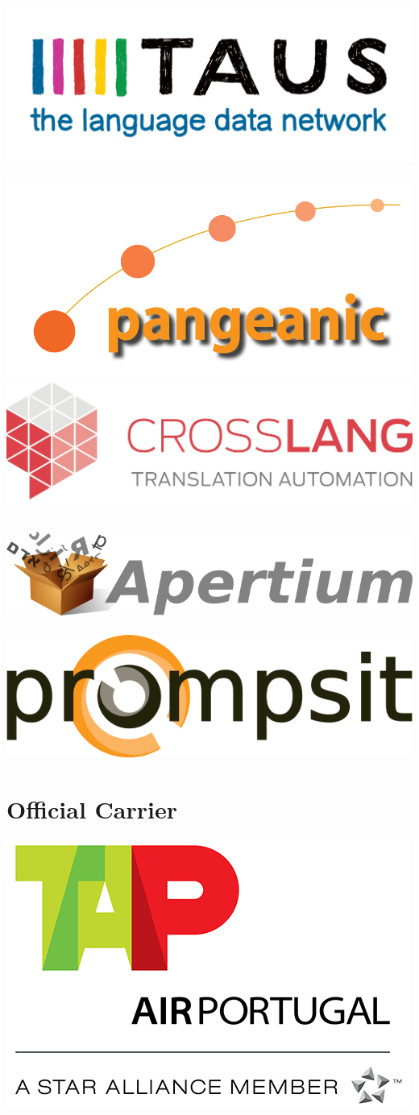 \documentclass[a4paper,11pt,twoside]{book}
\begin{document}
\includegraphics[width=0.50\columnwidth]{logos/taus-logo.png}

\hfill \includegraphics[width=0.50\columnwidth]{logos/pangeanic-logo.png}\\

\includegraphics[width=0.50\columnwidth]{logos/crosslang-logo.jpg}\\
\\

\hfill \includegraphics[width=0.50\columnwidth]{logos/apertium-logo.png}\\
\\

\includegraphics[width=0.50\columnwidth]{logos/prompsit-logo.png}

\newpage

\section*{Official Carrier}
\begin{center}
\includegraphics[width=0.5\columnwidth]{logos/tapairpt-logo.png}
\end{center}
\end{document}
